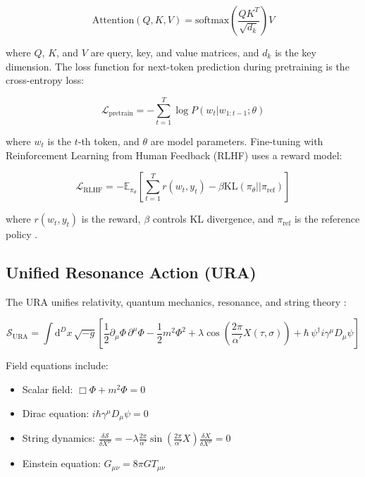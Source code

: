 \documentclass{article}
\begin{document}
\begin{equation}
\text{Attention}(Q, K, V) = \text{softmax}\left( \frac{Q K^T}{\sqrt{d_k}} \right) V
\label{eq:self_attention}
\end{equation}

where \(Q\), \(K\), and \(V\) are query, key, and value matrices, and \(d_k\) is the key dimension. The loss function for next-token prediction during pretraining is the cross-entropy loss:

\begin{equation}
\mathcal{L}_{\text{pretrain}} = -\sum_{t=1}^T \log P(w_t | w_{1:t-1}; \theta)
\label{eq:pretrain_loss}
\end{equation}

where \(w_t\) is the \(t\)-th token, and \(\theta\) are model parameters. Fine-tuning with Reinforcement Learning from Human Feedback (RLHF) uses a reward model:

\begin{equation}
\mathcal{L}_{\text{RLHF}} = -\mathbb{E}_{\pi_\theta} \left[ \sum_{t=1}^T r(w_t, y_t) - \beta \text{KL}(\pi_\theta || \pi_{\text{ref}}) \right]
\label{eq:rlhf_loss}
\end{equation}

where \(r(w_t, y_t)\) is the reward, \(\beta\) controls KL divergence, and \(\pi_{\text{ref}}\) is the reference policy \cite{ouyang2022instructgpt}.

\subsection{Unified Resonance Action (URA)}
The URA unifies relativity, quantum mechanics, resonance, and string theory \cite{user_provided_2025}:

\begin{equation}
\mathcal{S}_{\text{URA}} = \int \mathrm{d}^D x \, \sqrt{-g} \left[ \frac{1}{2} \partial_\mu \Phi \, \partial^\mu \Phi - \frac{1}{2} m^2 \Phi^2 + \lambda \cos\left( \frac{2\pi}{\alpha'} X(\tau,\sigma) \right) + \hbar \, \psi^\dagger i\gamma^\mu D_\mu \psi \right]
\label{eq:URA}
\end{equation}

Field equations include:
\begin{itemize}
    \item Scalar field: \(\Box \Phi + m^2 \Phi = 0\)
    \item Dirac equation: \(i\hbar \gamma^\mu D_\mu \psi = 0\)
    \item String dynamics: \(\frac{\delta \mathcal{S}}{\delta X^\mu} = -\lambda \frac{2\pi}{\alpha'} \sin\left( \frac{2\pi}{\alpha'} X \right) \frac{\delta X}{\delta X^\mu} = 0\)
    \item Einstein equation: \(G_{\mu\nu} = 8\pi G T_{\mu\nu}\)
\end{itemize}
\end{document}
